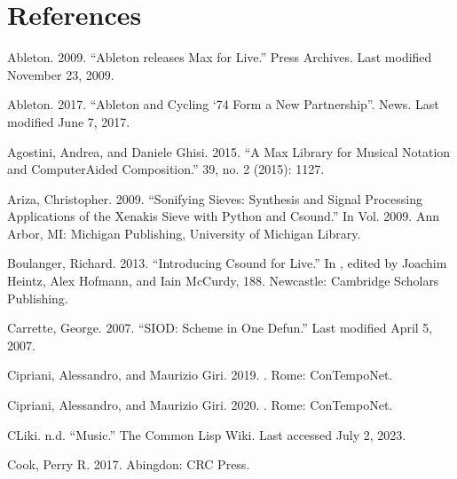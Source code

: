 \documentclass[letterpaper,10pt,english]{sphinxmanual}
\begin{document}
\sphinxstepscope


\chapter{References}
\label{\detokenize{bibliography:references}}\label{\detokenize{bibliography::doc}}
\sphinxAtStartPar
Ableton. 2009. “Ableton releases Max for Live.” Press Archives. Last modified November 23, 2009. 

\sphinxAtStartPar
Ableton. 2017. “Ableton and Cycling ‘74 Form a New Partnership”. News. Last modified June 7, 2017. 

\sphinxAtStartPar
Agostini, Andrea, and Daniele Ghisi. 2015. “A Max Library for Musical Notation and Computer\sphinxhyphen{}Aided Composition.”  39, no. 2 (2015): 11\textendash{}27.

\sphinxAtStartPar
Ariza, Christopher. 2009. “Sonifying Sieves: Synthesis and Signal Processing Applications of the Xenakis Sieve with Python and Csound.” In  Vol. 2009. Ann Arbor, MI: Michigan Publishing, University of Michigan Library.

\sphinxAtStartPar
Boulanger, Richard. 2013. “Introducing Csound for Live.” In , edited by Joachim Heintz, Alex Hofmann, and Iain McCurdy, 188. Newcastle: Cambridge Scholars Publishing.

\sphinxAtStartPar
Carrette, George. 2007. “SIOD: Scheme in One Defun.” Last modified April 5, 2007. 

\sphinxAtStartPar
Cipriani, Alessandro, and Maurizio Giri. 2019. . Rome: ConTempoNet.

\sphinxAtStartPar
Cipriani, Alessandro, and Maurizio Giri. 2020. . Rome: ConTempoNet.

\sphinxAtStartPar
CLiki. n.d. “Music.” The Common Lisp Wiki. Last accessed July 2, 2023. 

\sphinxAtStartPar
Cook, Perry R. 2017.  Abingdon: CRC Press.
\end{document}

